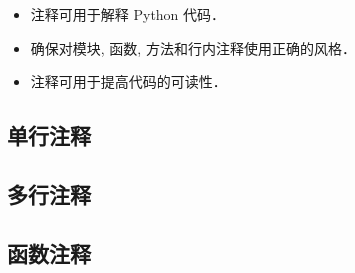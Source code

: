 
\begin{itemize}
\item 注释可用于解释 Python 代码．
\item 确保对模块, 函数, 方法和行内注释使用正确的风格．
\item 注释可用于提高代码的可读性．
\end{itemize}

\subsection{单行注释}

\subsection{多行注释}



\subsection{函数注释}
